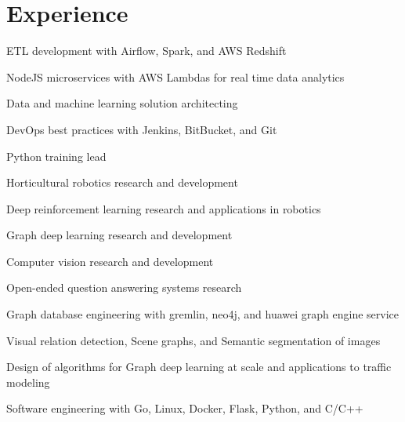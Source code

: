\documentclass[letterpaper]{deedy-resume} %
\begin{document}
\begin{minipage}[t]{0.66\textwidth} %


\section{Experience}
\vspace{\topsep}
\begin{tightitemize}
\item ETL development with Airflow, Spark, and AWS Redshift
\item NodeJS microservices with AWS Lambdas for real time data analytics
\item Data and machine learning solution architecting
\item DevOps best practices with Jenkins, BitBucket, and Git
\item Python training lead
\end{tightitemize}

\begin{tightitemize}
\item Horticultural robotics research and development
\item Deep reinforcement learning research and applications in robotics
\item Graph deep learning research and development
\item Computer vision research and development
\item Open-ended question answering systems research
\end{tightitemize}


\begin{tightitemize}
\item Graph database engineering with gremlin, neo4j, and huawei graph engine service
\item Visual relation detection, Scene graphs, and Semantic segmentation of images
\item Design of algorithms for Graph deep learning at scale and applications to traffic modeling
\item Software engineering with Go, Linux, Docker, Flask, Python, and C/C++
\end{tightitemize}


\end{minipage}
\end{document}
